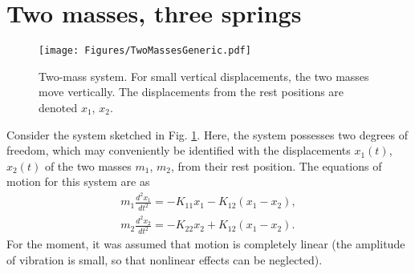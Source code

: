 \documentclass[11pt,twoside,a4paper,english]{book}
\begin{document}
\section{Two masses, three springs}
\begin{figure}
\texttt{[image: Figures/TwoMassesGeneric.pdf]}
\caption{Two-mass system. For small vertical displacements, the two masses move vertically. The displacements from the rest positions are denoted $x_1$, $x_2$.}\label{fig:TwoMassesGeneric}
\end{figure}

Consider the system sketched in Fig. \ref{fig:TwoMassesGeneric}. Here, the system possesses two degrees of freedom, which may conveniently be identified with the displacements $x_1(t)$, $x_2(t)$ of the two masses $m_1$, $m_2$, from their rest position. The equations of motion for this system are as
\begin{subequations}\label{eq:TwoMass1}
\begin{align}
m_1 \frac{d^2 x_1}{dt^2} = -K_{11}x_1 - K_{12}(x_1 - x_2), \label{eq:Coupl1} \\
m_2 \frac{d^2 x_2}{dt^2} = -K_{22}x_2 + K_{12}(x_1 - x_2). \label{eq:Coupl2}
\end{align}
\end{subequations}
For the moment, it was assumed that motion is completely linear (the amplitude of vibration is small, so that nonlinear effects can be neglected). 
\end{document}
